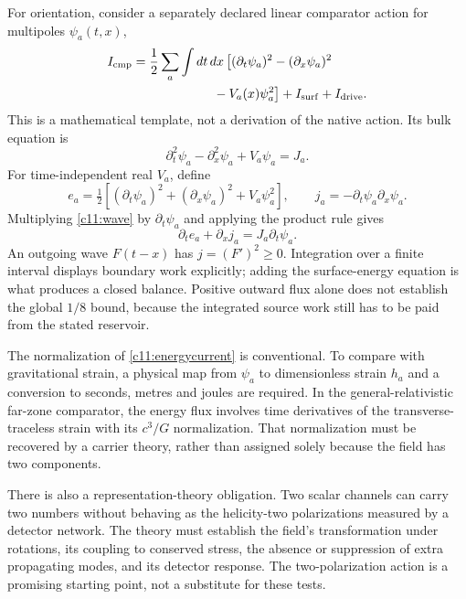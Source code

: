 For orientation, consider a separately declared linear comparator action for multipoles $\psi_a(t,x)$,
\begin{equation}
 \begin{aligned}
 I_{\rm cmp}={}&\frac12\sum_a\int dt\,dx\,
 \bigl[(\partial_t\psi_a)^2-(\partial_x\psi_a)^2\\
 &\hspace{5em}-V_a(x)\psi_a^2\bigr]
 +I_{\rm surf}+I_{\rm drive}.
 \end{aligned}
 \label{c11:comparatoraction}
\end{equation}
This is a mathematical template, not a derivation of the native action. Its bulk equation is
\begin{equation}
 \partial_t^2\psi_a-\partial_x^2\psi_a+V_a\psi_a=J_a.
 \label{c11:wave}
\end{equation}
For time-independent real $V_a$, define
\begin{equation}
 e_a=\tfrac12\left[(\partial_t\psi_a)^2+(\partial_x\psi_a)^2
                    +V_a\psi_a^2\right],\qquad
 j_a=-\partial_t\psi_a\partial_x\psi_a.
 \label{c11:energycurrent}
\end{equation}
Multiplying \eqref{c11:wave} by $\partial_t\psi_a$ and applying the product rule gives
\begin{equation}
 \partial_t e_a+\partial_x j_a=J_a\partial_t\psi_a.
 \label{c11:energyidentity}
\end{equation}
An outgoing wave $F(t-x)$ has $j=(F')^2\geq0$. Integration over a finite interval displays boundary work explicitly; adding the surface-energy equation is what produces a closed balance. Positive outward flux alone does not establish the global $1/8$ bound, because the integrated source work still has to be paid from the stated reservoir.

The normalization of \eqref{c11:energycurrent} is conventional. To compare with gravitational strain, a physical map from $\psi_a$ to dimensionless strain $h_a$ and a conversion to seconds, metres and joules are required. In the general-relativistic far-zone comparator, the energy flux involves time derivatives of the transverse-traceless strain with its $c^3/G$ normalization. That normalization must be recovered by a carrier theory, rather than assigned solely because the field has two components.

There is also a representation-theory obligation. Two scalar channels can carry two numbers without behaving as the helicity-two polarizations measured by a detector network. The theory must establish the field's transformation under rotations, its coupling to conserved stress, the absence or suppression of extra propagating modes, and its detector response. The two-polarization action is a promising starting point, not a substitute for these tests.

